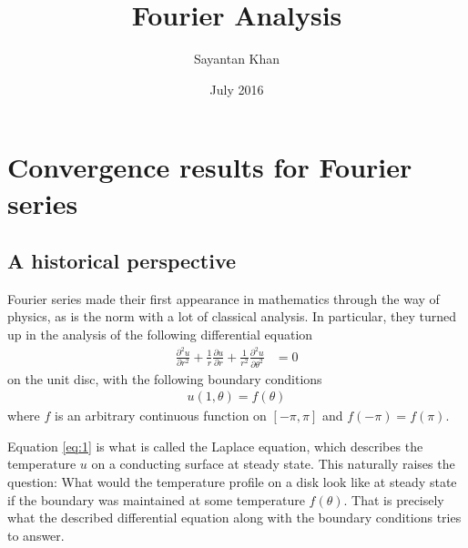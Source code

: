 \documentclass[12pt, titlepage]{article}
\title{Fourier Analysis}
\author{Sayantan Khan}
\date{July 2016}
\theoremstyle{definition}
\begin{document}
\tableofcontents

\newpage

\section{Convergence results for Fourier series}

\subsection{A historical perspective}
Fourier series made their first appearance in mathematics through the way of physics, as is the norm with a lot of classical analysis. In particular, they turned up in the analysis of the following differential equation
\begin{align}
    \frac{\partial^2 u}{\partial r^2} + \frac{1}{r} \frac{\partial u}{\partial r} + \frac{1}{r^2} \frac{\partial^2 u}{\partial \theta^2} &= 0 \label{eq:1}
\end{align}
on the unit disc, with the following boundary conditions
\begin{align*}
    u(1, \theta) = f(\theta)
\end{align*}
where $f$ is an arbitrary continuous function on $[-\pi, \pi]$ and $f(-\pi) = f(\pi)$.

Equation \ref{eq:1} is what is called the Laplace equation, which describes the temperature $u$ on a conducting surface at steady state. This naturally raises the question: What would the temperature profile on a disk look like at steady state if the boundary was maintained at some temperature $f(\theta)$. That is precisely what the described differential equation along with the boundary conditions tries to answer.
\end{document}
